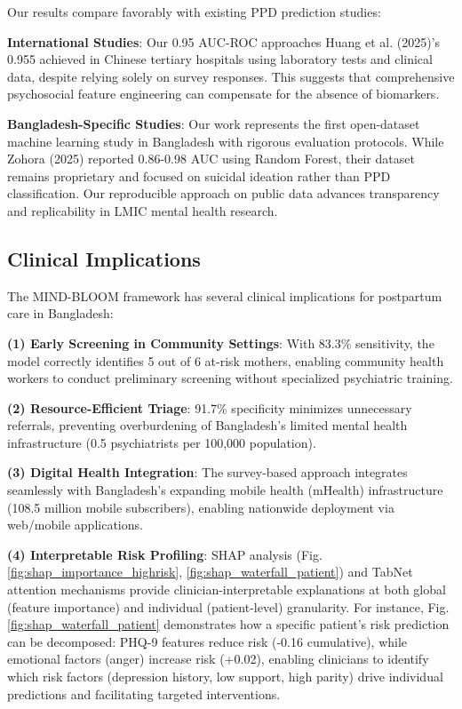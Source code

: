 Our results compare favorably with existing PPD prediction studies:

\textbf{International Studies}: Our 0.95 AUC-ROC approaches Huang et al. (2025)'s 0.955 achieved in Chinese tertiary hospitals using laboratory tests and clinical data, despite relying solely on survey responses. This suggests that comprehensive psychosocial feature engineering can compensate for the absence of biomarkers.

\textbf{Bangladesh-Specific Studies}: Our work represents the first open-dataset machine learning study in Bangladesh with rigorous evaluation protocols. While Zohora (2025) reported 0.86-0.98 AUC using Random Forest, their dataset remains proprietary and focused on suicidal ideation rather than PPD classification. Our reproducible approach on public data advances transparency and replicability in LMIC mental health research.

\subsection{Clinical Implications}

The MIND-BLOOM framework has several clinical implications for postpartum care in Bangladesh:

\textbf{(1) Early Screening in Community Settings}: With 83.3\% sensitivity, the model correctly identifies 5 out of 6 at-risk mothers, enabling community health workers to conduct preliminary screening without specialized psychiatric training.

\textbf{(2) Resource-Efficient Triage}: 91.7\% specificity minimizes unnecessary referrals, preventing overburdening of Bangladesh's limited mental health infrastructure (0.5 psychiatrists per 100,000 population).

\textbf{(3) Digital Health Integration}: The survey-based approach integrates seamlessly with Bangladesh's expanding mobile health (mHealth) infrastructure (108.5 million mobile subscribers), enabling nationwide deployment via web/mobile applications.

\textbf{(4) Interpretable Risk Profiling}: SHAP analysis (Fig. \ref{fig:shap_importance_highrisk}, \ref{fig:shap_waterfall_patient}) and TabNet attention mechanisms provide clinician-interpretable explanations at both global (feature importance) and individual (patient-level) granularity. For instance, Fig. \ref{fig:shap_waterfall_patient} demonstrates how a specific patient's risk prediction can be decomposed: PHQ-9 features reduce risk (-0.16 cumulative), while emotional factors (anger) increase risk (+0.02), enabling clinicians to identify which risk factors (depression history, low support, high parity) drive individual predictions and facilitating targeted interventions.

